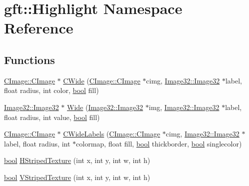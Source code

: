 \hypertarget{namespacegft_1_1Highlight}{\section{gft\-:\-:Highlight Namespace Reference}
\label{namespacegft_1_1Highlight}
}
\subsection*{Functions}
\begin{DoxyCompactItemize}
\item 
\hyperlink{namespacegft_1_1CImage_ae3efa12a0ed0755314837d3e5c974556}{C\-Image\-::\-C\-Image} $\ast$ \hyperlink{namespacegft_1_1Highlight_a65e5c68fff147b094fc0151c0ea1aff4}{C\-Wide} (\hyperlink{namespacegft_1_1CImage_ae3efa12a0ed0755314837d3e5c974556}{C\-Image\-::\-C\-Image} $\ast$cimg, \hyperlink{namespacegft_1_1Image32_a6c5a03566b593bb406f1fe33266a0382}{Image32\-::\-Image32} $\ast$label, float radius, int color, \hyperlink{namespacegft_a033dba4822661600b08d2bbf16879252}{bool} fill)
\item 
\hyperlink{namespacegft_1_1Image32_a6c5a03566b593bb406f1fe33266a0382}{Image32\-::\-Image32} $\ast$ \hyperlink{namespacegft_1_1Highlight_ac1ce29afe82a00debef164ba610e69a0}{Wide} (\hyperlink{namespacegft_1_1Image32_a6c5a03566b593bb406f1fe33266a0382}{Image32\-::\-Image32} $\ast$img, \hyperlink{namespacegft_1_1Image32_a6c5a03566b593bb406f1fe33266a0382}{Image32\-::\-Image32} $\ast$label, float radius, int value, \hyperlink{namespacegft_a033dba4822661600b08d2bbf16879252}{bool} fill)
\item 
\hyperlink{namespacegft_1_1CImage_ae3efa12a0ed0755314837d3e5c974556}{C\-Image\-::\-C\-Image} $\ast$ \hyperlink{namespacegft_1_1Highlight_a487ba7eafe8fb9c4ebddad61290197c1}{C\-Wide\-Labels} (\hyperlink{namespacegft_1_1CImage_ae3efa12a0ed0755314837d3e5c974556}{C\-Image\-::\-C\-Image} $\ast$cimg, \hyperlink{namespacegft_1_1Image32_a6c5a03566b593bb406f1fe33266a0382}{Image32\-::\-Image32} $\ast$label, float radius, int $\ast$colormap, float fill, \hyperlink{namespacegft_a033dba4822661600b08d2bbf16879252}{bool} thickborder, \hyperlink{namespacegft_a033dba4822661600b08d2bbf16879252}{bool} singlecolor)
\item 
\hyperlink{namespacegft_a033dba4822661600b08d2bbf16879252}{bool} \hyperlink{namespacegft_1_1Highlight_a9a97d711bef5edeb98bcd75b276e98f1}{H\-Striped\-Texture} (int x, int y, int w, int h)
\item 
\hyperlink{namespacegft_a033dba4822661600b08d2bbf16879252}{bool} \hyperlink{namespacegft_1_1Highlight_a885c271658412503999ad20ba7f4473e}{V\-Striped\-Texture} (int x, int y, int w, int h)

\end{DoxyCompactItemize}
